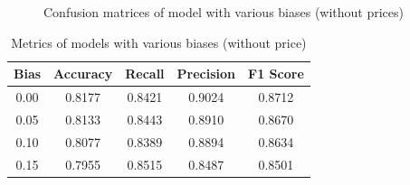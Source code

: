 \documentclass[12pt,twoside]{report}
\begin{document}
\begin{figure}[!htbp]
	\centering
	\hfill
	\hfill
	\hfil
	\caption{Confusion matrices of model with various biases (without prices)}
	\label{cm_exclude}
\end{figure}

\begin{table}[!htbp]
	\centering
	\caption{Metrics of models with various biases (without price)}
	\label{metrics_exclude}
	\begin{tabular}{| c | c | c | c | c |}
		\hline
		Bias & Accuracy & Recall & Precision & F1 Score \\
		\hline
		0.00 & 0.8177 & 0.8421 & 0.9024 & 0.8712 \\
		\hline
		0.05 & 0.8133 & 0.8443 & 0.8910 & 0.8670 \\
		\hline
		0.10 & 0.8077 & 0.8389 & 0.8894 & 0.8634 \\
		\hline
		0.15 & 0.7955 & 0.8515 & 0.8487 & 0.8501 \\
		\hline
	\end{tabular}
\end{table}
\end{document}
